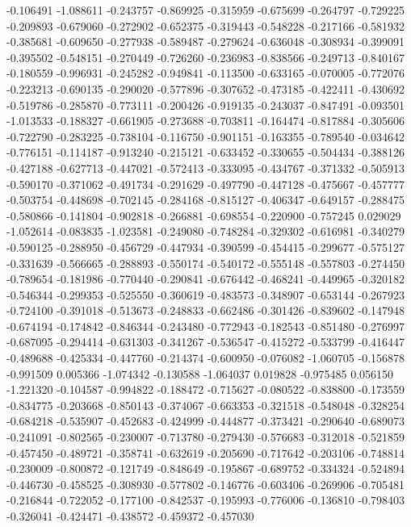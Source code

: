 -0.106491
-1.088611
-0.243757
-0.869925
-0.315959
-0.675699
-0.264797
-0.729225
-0.209893
-0.679060
-0.272902
-0.652375
-0.319443
-0.548228
-0.217166
-0.581932
-0.385681
-0.609650
-0.277938
-0.589487
-0.279624
-0.636048
-0.308934
-0.399091
-0.395502
-0.548151
-0.270449
-0.726260
-0.236983
-0.838566
-0.249713
-0.840167
-0.180559
-0.996931
-0.245282
-0.949841
-0.113500
-0.633165
-0.070005
-0.772076
-0.223213
-0.690135
-0.290020
-0.577896
-0.307652
-0.473185
-0.422411
-0.430692
-0.519786
-0.285870
-0.773111
-0.200426
-0.919135
-0.243037
-0.847491
-0.093501
-1.013533
-0.188327
-0.661905
-0.273688
-0.703811
-0.164474
-0.817884
-0.305606
-0.722790
-0.283225
-0.738104
-0.116750
-0.901151
-0.163355
-0.789540
-0.034642
-0.776151
-0.114187
-0.913240
-0.215121
-0.633452
-0.330655
-0.504434
-0.388126
-0.427188
-0.627713
-0.447021
-0.572413
-0.333095
-0.434767
-0.371332
-0.505913
-0.590170
-0.371062
-0.491734
-0.291629
-0.497790
-0.447128
-0.475667
-0.457777
-0.503754
-0.448698
-0.702145
-0.284168
-0.815127
-0.406347
-0.649157
-0.288475
-0.580866
-0.141804
-0.902818
-0.266881
-0.698554
-0.220900
-0.757245
0.029029
-1.052614
-0.083835
-1.023581
-0.249080
-0.748284
-0.329302
-0.616981
-0.340279
-0.590125
-0.288950
-0.456729
-0.447934
-0.390599
-0.454415
-0.299677
-0.575127
-0.331639
-0.566665
-0.288893
-0.550174
-0.540172
-0.555148
-0.557803
-0.274450
-0.789654
-0.181986
-0.770440
-0.290841
-0.676442
-0.468241
-0.449965
-0.320182
-0.546344
-0.299353
-0.525550
-0.360619
-0.483573
-0.348907
-0.653144
-0.267923
-0.724100
-0.391018
-0.513673
-0.248833
-0.662486
-0.301426
-0.839602
-0.147948
-0.674194
-0.174842
-0.846344
-0.243480
-0.772943
-0.182543
-0.851480
-0.276997
-0.687095
-0.294414
-0.631303
-0.341267
-0.536547
-0.415272
-0.533799
-0.416447
-0.489688
-0.425334
-0.447760
-0.214374
-0.600950
-0.076082
-1.060705
-0.156878
-0.991509
0.005366
-1.074342
-0.130588
-1.064037
0.019828
-0.975485
0.056150
-1.221320
-0.104587
-0.994822
-0.188472
-0.715627
-0.080522
-0.838800
-0.173559
-0.834775
-0.203668
-0.850143
-0.374067
-0.663353
-0.321518
-0.548048
-0.328254
-0.684218
-0.535907
-0.452683
-0.424999
-0.444877
-0.373421
-0.290640
-0.689073
-0.241091
-0.802565
-0.230007
-0.713780
-0.279430
-0.576683
-0.312018
-0.521859
-0.457450
-0.489721
-0.358741
-0.632619
-0.205690
-0.717642
-0.203106
-0.748814
-0.230009
-0.800872
-0.121749
-0.848649
-0.195867
-0.689752
-0.334324
-0.524894
-0.446730
-0.458525
-0.308930
-0.577802
-0.146776
-0.603406
-0.269906
-0.705481
-0.216844
-0.722052
-0.177100
-0.842537
-0.195993
-0.776006
-0.136810
-0.798403
-0.326041
-0.424471
-0.438572
-0.459372
-0.457030
